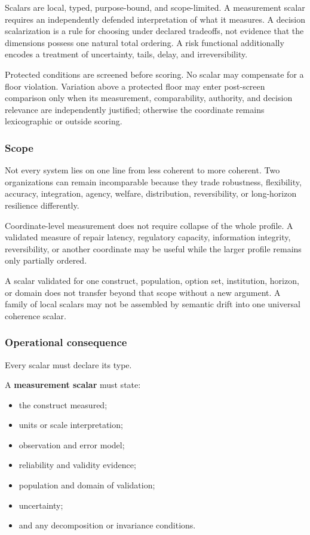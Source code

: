 \documentclass[
  11pt,
]{article}
\providecommand{\tightlist}{%
  \setlength{\itemsep}{0pt}\setlength{\parskip}{0pt}}
\begin{document}
Scalars are local, typed, purpose-bound, and scope-limited. A
measurement scalar requires an independently defended interpretation of
what it measures. A decision scalarization is a rule for choosing under
declared tradeoffs, not evidence that the dimensions possess one natural
total ordering. A risk functional additionally encodes a treatment of
uncertainty, tails, delay, and irreversibility.

Protected conditions are screened before scoring. No scalar may
compensate for a floor violation. Variation above a protected floor may
enter post-screen comparison only when its measurement, comparability,
authority, and decision relevance are independently justified; otherwise
the coordinate remains lexicographic or outside scoring.

\subsubsection{Scope}\label{scope-1}

Not every system lies on one line from less coherent to more coherent.
Two organizations can remain incomparable because they trade robustness,
flexibility, accuracy, integration, agency, welfare, distribution,
reversibility, or long-horizon resilience differently.

Coordinate-level measurement does not require collapse of the whole
profile. A validated measure of repair latency, regulatory capacity,
information integrity, reversibility, or another coordinate may be
useful while the larger profile remains only partially ordered.

A scalar validated for one construct, population, option set,
institution, horizon, or domain does not transfer beyond that scope
without a new argument. A family of local scalars may not be assembled
by semantic drift into one universal coherence scalar.

\subsubsection{Operational consequence}\label{operational-consequence-1}

Every scalar must declare its type.

A \textbf{measurement scalar} must state:

\begin{itemize}
\tightlist
\item
  the construct measured;
\item
  units or scale interpretation;
\item
  observation and error model;
\item
  reliability and validity evidence;
\item
  population and domain of validation;
\item
  uncertainty;
\item
  and any decomposition or invariance conditions.
\end{itemize}
\end{document}
